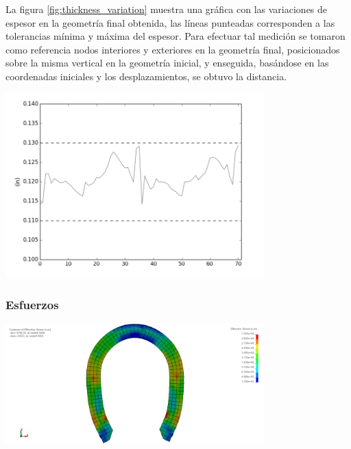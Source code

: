 La figura \ref{fig:thickness_variation} muestra una gráfica con las variaciones de espesor en la geometría 
final obtenida, las líneas punteadas corresponden a las tolerancias mínima y máxima del espesor. Para 
efectuar tal medición se tomaron como referencia nodos interiores y exteriores en la geometría final, 
posicionados sobre la misma vertical en la geometría inicial, y enseguida, basándose en las coordenadas 
iniciales y los desplazamientos, se obtuvo la distancia.

\begin{center}
\includegraphics[width=0.75\textwidth]{src/ch4/thickness_variation.png}
\label{fig:thickness_variation}
\end{center}

\subsubsection{Esfuerzos}

\begin{center}
\includegraphics[width=0.75\textwidth]{src/ch4/von_mises_01.png}
\label{fig:von_mises_01}
\end{center}

